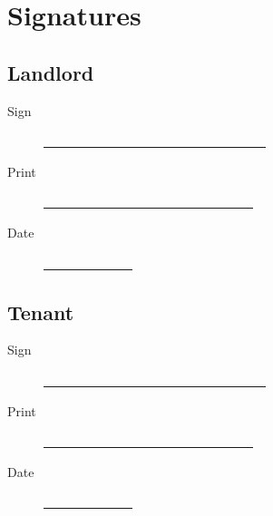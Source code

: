 \documentclass{amsart}
\begin{document}
\section*{Signatures}
\subsection*{Landlord}
\begin{description}
    \item[Sign]
        \underline{\ \ \ \ \ \ \ \ \ \ \ \ \ \ \ \ \ \ \ \ \ \ \ \ \ \ \ \ \ \ \ \ \ \ \ }
    \item[Print]
        \underline{\ \ \ \ \ \ \ \ \ \ \ \ \ \ \ \ \ \ \ \ \ \ \ \ \ \ \ \ \ \ \ \ \ }
    \item[Date]
        \underline{\ \ \ \ \ \ \ \ \ \ \ \ \ \ }
\end{description}
\subsection*{Tenant}
\begin{description}
    \item[Sign]
        \underline{\ \ \ \ \ \ \ \ \ \ \ \ \ \ \ \ \ \ \ \ \ \ \ \ \ \ \ \ \ \ \ \ \ \ \ }
    \item[Print]
        \underline{\ \ \ \ \ \ \ \ \ \ \ \ \ \ \ \ \ \ \ \ \ \ \ \ \ \ \ \ \ \ \ \ \ }
    \item[Date]
        \underline{\ \ \ \ \ \ \ \ \ \ \ \ \ \ }
\end{description}
\end{document}
